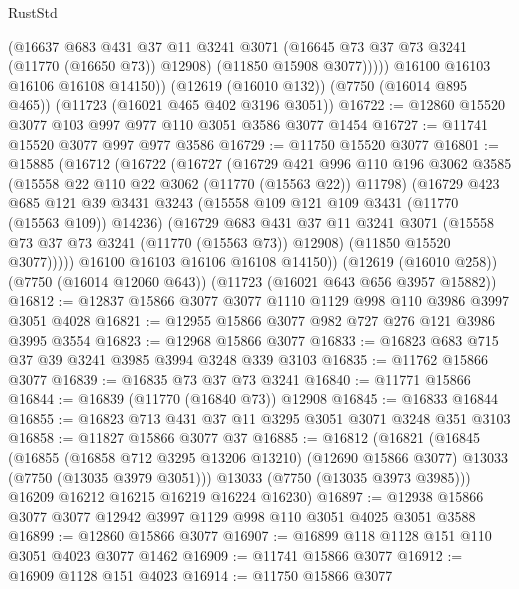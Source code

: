 \begin{lexlean}{RustStd}
\begin{coremodule}
              (@16637
                @683
                @431
                @37
                @11
                @3241
                @3071
                (@16645 @73 @37 @73 @3241 (@11770 (@16650 @73)) @12908)
                (@11850 @15908 @3077)))))
        @16100
        @16103
        @16106
        @16108
        @14150))
    (@12619 (@16010 @132))
    (@7750 (@16014 @895 @465))
    (@11723 (@16021 @465 @402 @3196 @3051))
@16722 := @12860 @15520 @3077 @103 @997 @977 @110 @3051 @3586 @3077 @1454
@16727 := @11741 @15520 @3077 @997 @977 @3586
@16729 := @11750 @15520 @3077
@16801 := @15885
    (@16712
      (@16722
        (@16727
          (@16729
            @421
            @996
            @110
            @196
            @3062
            @3585
            (@15558 @22 @110 @22 @3062 (@11770 (@15563 @22)) @11798)
            (@16729
              @423
              @685
              @121
              @39
              @3431
              @3243
              (@15558 @109 @121 @109 @3431 (@11770 (@15563 @109)) @14236)
              (@16729
                @683
                @431
                @37
                @11
                @3241
                @3071
                (@15558 @73 @37 @73 @3241 (@11770 (@15563 @73)) @12908)
                (@11850 @15520 @3077)))))
        @16100
        @16103
        @16106
        @16108
        @14150))
    (@12619 (@16010 @258))
    (@7750 (@16014 @12060 @643))
    (@11723 (@16021 @643 @656 @3957 @15882))
@16812 := @12837 @15866 @3077 @3077 @1110 @1129 @998 @110 @3986 @3997 @3051 @4028
@16821 := @12955 @15866 @3077 @982 @727 @276 @121 @3986 @3995 @3554
@16823 := @12968 @15866 @3077
@16833 := @16823 @683 @715 @37 @39 @3241 @3985 @3994 @3248 @339 @3103
@16835 := @11762 @15866 @3077
@16839 := @16835 @73 @37 @73 @3241
@16840 := @11771 @15866
@16844 := @16839 (@11770 (@16840 @73)) @12908
@16845 := @16833 @16844
@16855 := @16823 @713 @431 @37 @11 @3295 @3051 @3071 @3248 @351 @3103
@16858 := @11827 @15866 @3077 @37
@16885 := @16812
    (@16821
      (@16845
        (@16855
          (@16858 @712 @3295 @13206 @13210)
          (@12690 @15866 @3077)
          @13033
          (@7750 (@13035 @3979 @3051)))
        @13033
        (@7750 (@13035 @3973 @3985)))
      @16209
      @16212
      @16215
      @16219
      @16224
      @16230)
@16897 := @12938 @15866 @3077 @3077 @12942 @3997 @1129 @998 @110 @3051 @4025 @3051 @3588
@16899 := @12860 @15866 @3077
@16907 := @16899 @118 @1128 @151 @110 @3051 @4023 @3077 @1462
@16909 := @11741 @15866 @3077
@16912 := @16909 @1128 @151 @4023
@16914 := @11750 @15866 @3077

\end{coremodule}
\end{lexlean}
